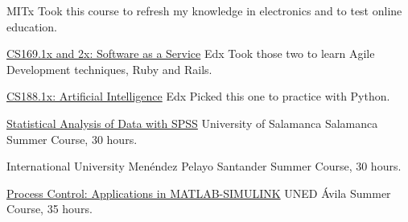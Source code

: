 \documentclass[11pt,a4paper,roman]{moderncv}
\begin{document}
	{MITx}
	{}
	{}
	{Took this course to refresh my knowledge in electronics and to test online education.} 

	{\href{https://www.edx.org/courses/BerkeleyX/CS169.1x/2013_Spring/about}
	{CS169.1x and 2x: Software as a Service}}
	{Edx}
	{}
	{}
	{Took those two to learn Agile Development techniques, Ruby and Rails.} 

	{\href{https://6002x.mitx.mit.edu/}
	{CS188.1x: Artificial Intelligence}}
	{Edx}
	{}
	{}
	{Picked this one to practice with Python.} 


	{\href{http://biplot.usal.es/verano/analisis-estadistico-de-dat.html}
	{Statistical Analysis of Data with SPSS}}
	{University of Salamanca}
	{Salamanca}
	{}
	{Summer Course, 30 hours.}

	{International University Men\'endez Pelayo}
	{Santander}
	{}
	{Summer Course, 30 hours.}




					{\href{http://portal.uned.es/portal/page?_pageid=93,22547880&_dad=portal&_schema=PORTAL&idCurso=042}		{Process Control: Applications in MATLAB-SIMULINK}}
	{UNED}
	{\'Avila}
	{}
	{Summer Course, 35 hours.}
\end{document}
